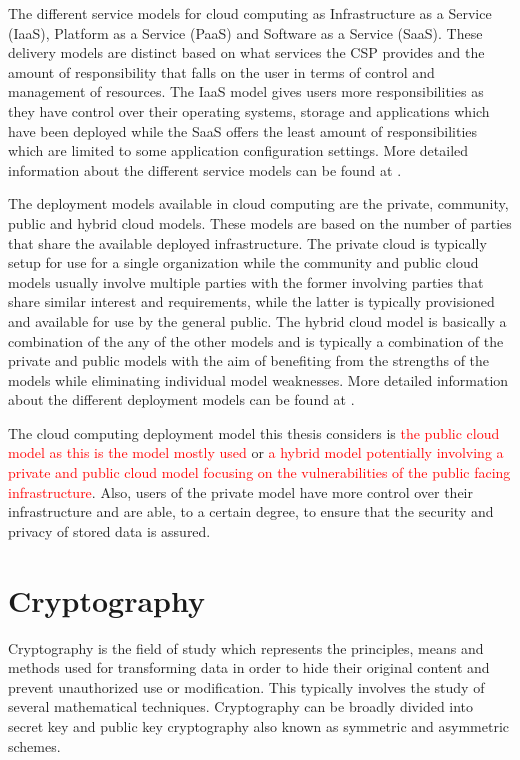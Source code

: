 The different service models for cloud computing as Infrastructure as a Service (IaaS), Platform as a Service (PaaS) and Software as a Service (SaaS). These delivery models are distinct based on what services the CSP provides and the amount of responsibility that falls on the user in terms of control and management of resources. The IaaS model gives users more responsibilities as they have control over their operating systems, storage and applications which have been deployed while the SaaS offers the least amount of responsibilities which are limited to some application configuration settings. More detailed information about the different service models can be found at \cite{nist}.

The deployment models available in cloud computing are the private, community, public and hybrid cloud models. These models are based on the number of parties that share the available deployed infrastructure. The private cloud is typically setup for use for a single organization while the community and public cloud models usually involve multiple parties with the former involving parties that share similar interest and requirements, while the latter is typically provisioned and available for use by the general public. The hybrid cloud model is basically a combination of the any of the other models and is typically a combination of the private and public models with the aim of benefiting from the strengths of the models while eliminating individual model weaknesses. More detailed information about the different deployment models can be found at \cite{nist}.

The cloud computing deployment model this thesis considers is \textcolor{red}{the public cloud model as this is the model mostly used} or \textcolor{red}{a hybrid model potentially involving a private and public cloud model focusing on the vulnerabilities of the public facing infrastructure}. Also, users of the private model have more control over their infrastructure and are able, to a certain degree, to ensure that the security and privacy of stored data is assured.


\section{Cryptography}

Cryptography\cite{Kissel2013} is the field of study which represents the principles, means and methods used for transforming data in order to hide their original content and prevent unauthorized use or modification. This typically involves the study of several mathematical techniques. Cryptography can be broadly divided into secret key and public key cryptography also known as symmetric and asymmetric schemes.

